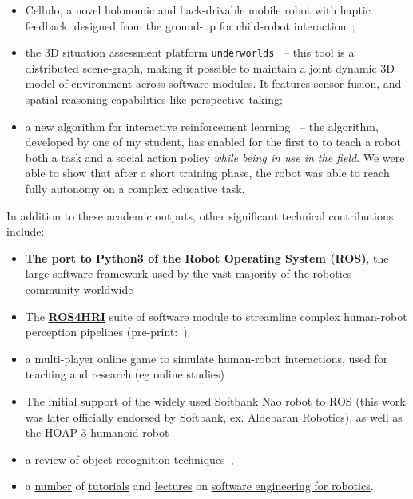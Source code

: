 \begin{itemize}
    \item Cellulo, a novel holonomic and back-drivable mobile robot with haptic
        feedback, designed from the ground-up for child-robot
        interaction~\cite{ozgur2016permanent,ozgur2017cellulo};

    \item the 3D situation assessment platform
        \texttt{underworlds}~\autocite{lemaignan2018underworlds} -- this tool
        is a distributed scene-graph, making it possible to maintain a joint
        dynamic 3D model of environment across software modules. It features
        sensor fusion, and spatial reasoning capabilities like perspective
        taking;

    \item a new algorithm for interactive reinforcement
        learning~\autocite{senft2017supervised} -- the algorithm, developed by
        one of my student, has enabled for the first to to teach a robot both a
        task and a social action policy \emph{while being in use in the field}.
        We were able to show that after a short training phase, the robot was
        able to reach fully autonomy on a complex educative task.
\end{itemize}


\vspace{2em}

In addition to these academic outputs, other significant technical contributions
include:

\begin{itemize}
    \item \textbf{The port to Python3 of the Robot Operating System (ROS)}, the large
        software framework used by the vast majority of the robotics community
        worldwide
    \item The \href{https://github.com/ros4hri/ros4hri}{\textbf{ROS4HRI}}
        suite of software module to streamline complex human-robot perception
        pipelines (pre-print:~\cite{mohamed2020ros})
    \item a multi-player online game to simulate human-robot interactions, used
        for teaching and research (eg online studies)
    \item The initial support of the widely used Softbank Nao robot to ROS (this
        work was later officially endorsed by Softbank, ex. Aldebaran Robotics),
        as well as the HOAP-3 humanoid robot
    \item a review of object recognition techniques~\autocite{wallbridge2017qualitative}, 
    \item a         \href{https://github.com/severin-lemaignan/lecture-software-engineering}{number} of
        \href{https://github.com/severin-lemaignan/lecture-intro-programming-for-robotics}{tutorials}
        and \href{https://github.com/severin-lemaignan/git-presentation}{lectures} on \href{https://github.com/severin-lemaignan/ros-presentation}{software engineering for
        robotics}.
\end{itemize}



